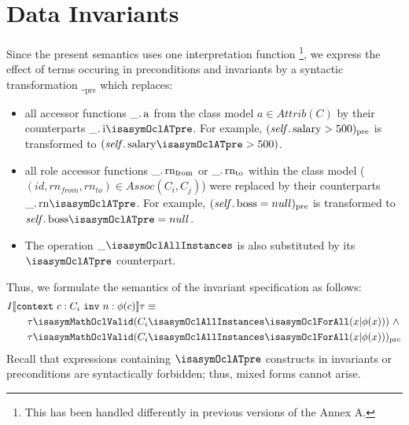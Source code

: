 \section{Data Invariants}
\label{sec:invlogic}
Since the present \OCL semantics uses one interpretation function \footnote{This has been handled 
differently in previous versions of the Annex A.}, we express the effect of \OCL terms
occuring in preconditions and invariants by a syntactic transformation $\__\text{pre}$ which 
replaces:
\begin{itemize}
\item all accessor functions $\getAttrib{\_}{a}$ from the class model $a \in Attrib(C)$ by their 
counterparts $\getAttrib{\_}{i\isasymOclATpre}$. For example, $(\getAttrib{\self}{salary} >
500)_\text{pre}$ is transformed to $(\getAttrib{\self}{salary\isasymOclATpre} > 500)$. 
\item all role accessor functions  $\getRole{\_}{rn_{from}}$ or  $\getRole{\_}{rn_{to}}$ 
      within the class model (\ie{} $(id, rn_{from},  rn_{to}) \in Assoc(C_i, C_j)$)
      were replaced by their counterparts $\getRole{\_}{rn\isasymOclATpre}$.
      For example, $(\getAttrib{\self}{boss} = null)_\text{pre}$ is transformed to
      $\getAttrib{\self}{boss\isasymOclATpre} = null$.
\item The operation $\_\isasymOclAllInstances$ is also substituted by its
$\isasymOclATpre$ counterpart.  
\end{itemize}
Thus, we formulate the semantics of the invariant specification  as follows:
\begin{gather}\label{eq:inv}
\begin{aligned}
& I\semantics{\mathtt{context}~c:C_i~\mathtt{inv}~n: \phi(c)} \tau \equiv  \\
&\qquad \tau  \isasymMathOclValid  (C_i\isasymOclAllInstances\isasymOclForAll(x
\text{|} \phi(x)))~\land \\
&\qquad \tau  \isasymMathOclValid (C_i\isasymOclAllInstances\isasymOclForAll(x
\text{|} \phi(x)))_\text{pre} 
\end{aligned}
\end{gather}
Recall that  expressions containing $\isasymOclATpre$ constructs in
invariants or preconditions are syntactically forbidden; thus, mixed forms cannot arise.

